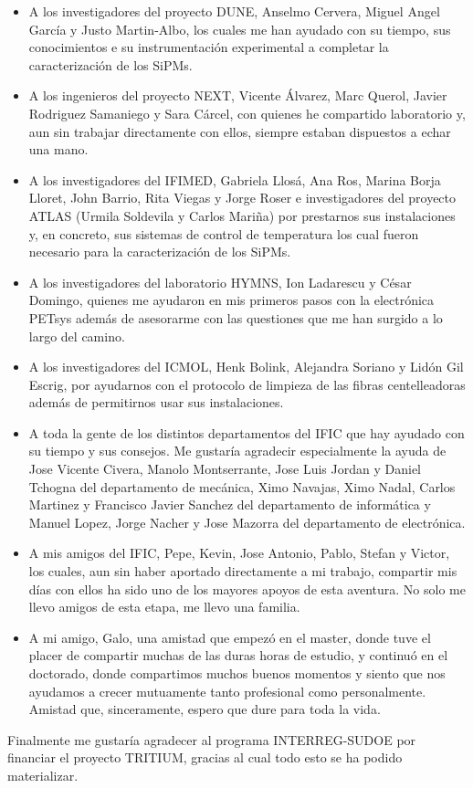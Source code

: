\begin{itemize}

\item{} A los investigadores del proyecto DUNE, Anselmo Cervera, Miguel Angel García y Justo Martin-Albo, los cuales me han ayudado con su tiempo, sus conocimientos e su instrumentación experimental a completar la caracterización de los SiPMs. 

\item{} A los ingenieros del proyecto NEXT, Vicente Álvarez, Marc Querol, Javier Rodriguez Samaniego y Sara Cárcel, con quienes he compartido laboratorio y, aun sin trabajar directamente con ellos, siempre estaban dispuestos a echar una mano. 

\item{} A los investigadores del IFIMED, Gabriela Llosá, Ana Ros, Marina Borja Lloret, John Barrio, Rita Viegas y Jorge Roser e investigadores del proyecto ATLAS (Urmila Soldevila y Carlos Mariña) por prestarnos sus instalaciones y, en concreto, sus sistemas de control de temperatura los cual fueron necesario para la caracterización de los SiPMs. 

\item{} A los investigadores del laboratorio HYMNS, Ion Ladarescu y César Domingo, quienes me ayudaron en mis primeros pasos con la electrónica PETsys además de asesorarme con las questiones que me han surgido a lo largo del camino.

\item{} A los investigadores del ICMOL, Henk Bolink, Alejandra Soriano y Lidón Gil Escrig, por ayudarnos con el protocolo de limpieza de las fibras centelleadoras además de permitirnos usar sus instalaciones.

\item{} A toda la gente de los distintos departamentos del IFIC que hay ayudado con su tiempo y sus consejos. Me gustaría agradecir especialmente la ayuda de Jose Vicente Civera, Manolo Montserrante, Jose Luis Jordan y Daniel Tchogna del departamento de mecánica, Ximo Navajas, Ximo Nadal, Carlos Martinez y Francisco Javier Sanchez del departamento de informática y Manuel Lopez, Jorge Nacher y Jose Mazorra del departamento de electrónica.

\item{} A mis amigos del IFIC, Pepe, Kevin, Jose Antonio, Pablo, Stefan y Victor, los cuales, aun sin haber aportado directamente a mi trabajo, compartir mis días con ellos ha sido uno de los mayores apoyos de esta aventura. No solo me llevo amigos de esta etapa, me llevo una familia.

\item{} A mi amigo, Galo, una amistad que empezó en el master, donde tuve el placer de compartir muchas de las duras horas de estudio, y continuó en el doctorado, donde compartimos muchos buenos momentos y siento que nos ayudamos a crecer mutuamente tanto profesional como personalmente. Amistad que, sinceramente, espero que dure para toda la vida.

\end{itemize} 

Finalmente me gustaría agradecer al programa INTERREG-SUDOE por financiar el proyecto TRITIUM, gracias al cual todo esto se ha podido materializar.